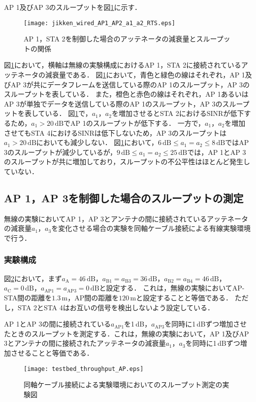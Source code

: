 \documentclass[master]{kuisthesis}		%
\begin{document}
AP 1及びAP 3のスループットを図\ref{throughput_a1_a2_RTS}に示す．
\ifnum {}
\begin{figure}[!t]
\centering
\texttt{[image: jikken\_wired\_AP1\_AP2\_a1\_a2\_RTS.eps]}
\caption{AP 1，STA 2を制御した場合のアッテネータの減衰量とスループットの関係}
\label{throughput_a1_a2_RTS}
\end{figure}
\fi
図\ref{throughput_a1_a2_RTS}において，横軸は無線の実験構成におけるAP 1，STA 2に接続されているアッテネータの減衰量である．
図\ref{throughput_a1_a2_RTS}において，青色と緑色の線はそれぞれ，AP 1及びAP 3が共にデータフレームを送信している際のAP 1のスループット，AP 3のスループットを表している．
また，橙色と赤色の線はそれぞれ，AP 1あるいはAP 3が単独でデータを送信している際のAP 1のスループット，AP 3のスループットを表している．
図\ref{throughput_a1_a2_RTS}で，$a_1$，$a_2$を増加させるとSTA 2におけるSINRが低下するため，$a_1 > 20\,\mathrm{dB}$でAP 1のスループットが低下する．
一方で，$a_1$，$a_2$を増加させてもSTA 4におけるSINRは低下しないため，AP 3のスループットは$a_1 > 20\,\mathrm{dB}$においても減少しない．
図\ref{throughput_a1_a2_RTS}において，$6\,\mathrm{dB} \leq a_1 = a_2 \leq 8\,\mathrm{dB}$ではAP 3のスループットが減少しているが，$9\,\mathrm{dB} \leq a_1 = a_2 \leq 25\,\mathrm{dB}$では，AP 1とAP 3のスループットが共に増加しており，スループットの不公平性はほとんど発生していない．

\subsection{AP 1，AP 3を制御した場合のスループットの測定}\label{AP1，AP 3制御}
無線の実験においてAP 1，AP 3とアンテナの間に接続されているアッテネータの減衰量$a_1$，$a_3$を変化させる場合の実験を同軸ケーブル接続による有線実験環境で行う．
\subsubsection{実験構成}\label{AP1AP3実験構成}
図\ref{t_AP_mesure}において，まず$a_\mathrm{A} = 46\,\mathrm{dB}$，$a_\mathrm{B1} = a_\mathrm{B3} = 36\,\mathrm{dB}$，$a_\mathrm{B2} =a_\mathrm{B4} = 46\,\mathrm{dB}$，$a_\mathrm{C} = 0\,\mathrm{dB}$，$a_\mathrm{AP1} = a_\mathrm{AP3} = 0\,\mathrm{dB}$と設定する．
これは，無線の実験においてAP-STA間の距離を$1.3\,\mathrm{m}$，AP間の距離を$120\,\mathrm{m}$と設定することと等価である．
ただし，STA 2とSTA 4はお互いの信号を検出しないよう設定している．

AP 1とAP 3の間に接続されている$a_\mathrm{AP1}$を1\,dB，$a_\mathrm{AP3}$を同時に1\,dBずつ増加させたときのスループットを測定する．これは，無線の実験において，AP 1及びAP 3とアンテナの間に接続されたアッテネータの減衰量$a_1$，$a_3$を同時に1\,dBずつ増加させることと等価である．
\ifnum {}
\begin{figure}[!t]
\centering
\texttt{[image: testbed\_throughput\_AP.eps]}
\caption{同軸ケーブル接続による実験環境においてのスループット測定の実験図}
\label{t_AP_mesure}
\end{figure}
\fi
\end{document}
